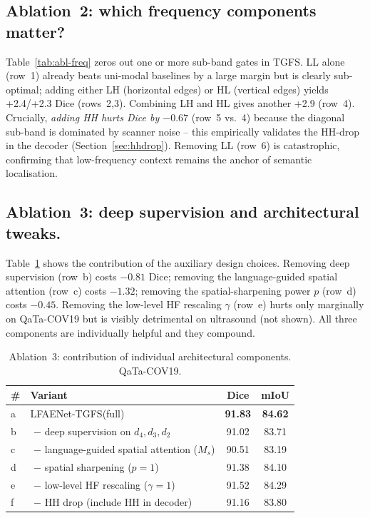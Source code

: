 \documentclass[runningheads]{llncs}
\newcommand{\method}{LFAENet-TGFS\xspace}
\newcommand{\tgfs}{TGFS\xspace}
\newcommand{\best}[1]{\textbf{#1}}
\begin{document}
\subsection{Ablation~2: which frequency components matter?}
\label{sec:abl-freq}
Table~\ref{tab:abl-freq} zeros out one or more sub-band gates in
\tgfs. LL alone (row~1) already beats uni-modal baselines by a large
margin but is clearly sub-optimal; adding either LH (horizontal
edges) or HL (vertical edges) yields +2.4/+2.3 Dice (rows~2,3).
Combining LH and HL gives another +2.9 (row~4). Crucially, \emph{adding
HH hurts Dice by $-0.67$} (row~5 vs.~4) because the diagonal sub-band
is dominated by scanner noise -- this empirically validates the
HH-drop in the decoder (Section~\ref{sec:hhdrop}). Removing LL
(row~6) is catastrophic, confirming that low-frequency context
remains the anchor of semantic localisation.

\subsection{Ablation~3: deep supervision and architectural tweaks.}
\label{sec:abl-arch}
Table~\ref{tab:abl-arch} shows the contribution of the auxiliary
design choices. Removing deep supervision (row~b) costs $-0.81$
Dice; removing the language-guided spatial attention (row~c) costs
$-1.32$; removing the spatial-sharpening power $p$ (row~d) costs
$-0.45$. Removing the low-level HF rescaling $\gamma$ (row~e) hurts
only marginally on QaTa-COV19 but is visibly detrimental on
ultrasound (not shown). All three components are individually
helpful and they compound.

\begin{table}[t]
\centering
\caption{Ablation~3: contribution of individual architectural
components. QaTa-COV19.}
\label{tab:abl-arch}
\setlength{\tabcolsep}{5pt}
\scriptsize
\begin{tabular}{l l c c}
\toprule
\# & Variant & Dice & mIoU \\
\midrule
a & \method (full) & \best{91.83} & \best{84.62} \\
b & \,\,$-$ deep supervision on $d_4,d_3,d_2$ & 91.02 & 83.71 \\
c & \,\,$-$ language-guided spatial attention ($M_s$) & 90.51 & 83.19 \\
d & \,\,$-$ spatial sharpening ($p\!=\!1$) & 91.38 & 84.10 \\
e & \,\,$-$ low-level HF rescaling ($\gamma\!=\!1$) & 91.52 & 84.29 \\
f & \,\,$-$ HH drop (include HH in decoder) & 91.16 & 83.80 \\
\bottomrule
\end{tabular}
\end{table}
\end{document}
